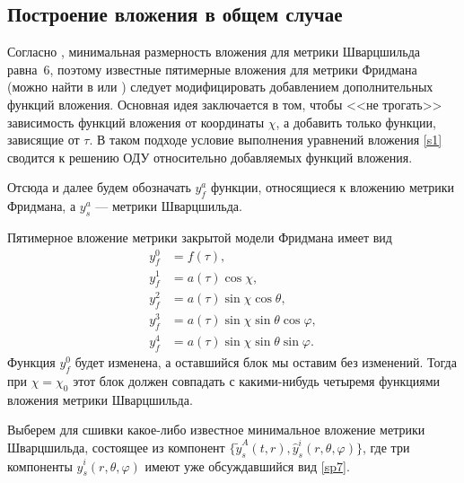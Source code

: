 \documentclass[12pt]{article}
\newcommand{\ff}{\varphi}
\newcommand{\te}{\theta}
\begin{document}
\subsection{Построение вложения в общем случае}
Согласно \cite{kasner2}, минимальная размерность вложения для метрики Шварцшильда равна~$6$, поэтому известные пятимерные вложения для метрики Фридмана (можно найти в \cite{statja29} или \cite{rosen65, robertson1933}) следует модифицировать добавлением дополнительных функций вложения. Основная идея заключается в том, чтобы <<не трогать>> зависимость функций вложения от координаты $\chi$, а добавить только функции, зависящие от $\tau$. В таком подходе условие выполнения уравнений вложения \eqref{s1} сводится к решению ОДУ относительно добавляемых функций вложения.

Отсюда и далее будем обозначать $y^a_f$ функции, относящиеся к вложению метрики Фридмана, а $y^a_s$ --- метрики Шварцшильда.

Пятимерное вложение метрики закрытой модели Фридмана имеет вид
\begin{align}
	y^0_f &= f(\tau), \\
\label{0}	y^1_f &= a(\tau) \cos{\chi}, \\
\label{1}	y^2_f &= a(\tau) \sin{\chi} \cos{\theta}, \\
\label{2}	y^3_f &= a(\tau) \sin{\chi} \sin{\theta} \cos{\varphi}, \\
\label{3}	y^4_f &= a(\tau) \sin{\chi} \sin{\theta} \sin{\varphi}.
\end{align}
Функция $y^0_f$ будет изменена, а оставшийся блок мы оставим без изменений. Тогда при $\chi = \chi_0$ этот блок должен совпадать с какими-нибудь четыремя функциями вложения метрики Шварцшильда.

Выберем для сшивки какое-либо известное минимальное вложение метрики Шварцшильда, состоящее из компонент $\{\tilde y_s^A(t,r),\hat y_s^i(r,\te,\ff)\}$, где три компоненты $\hat y_s^i(r,\te,\ff)$ имеют уже обсуждавшийся вид \eqref{sp7}. 
\end{document}
